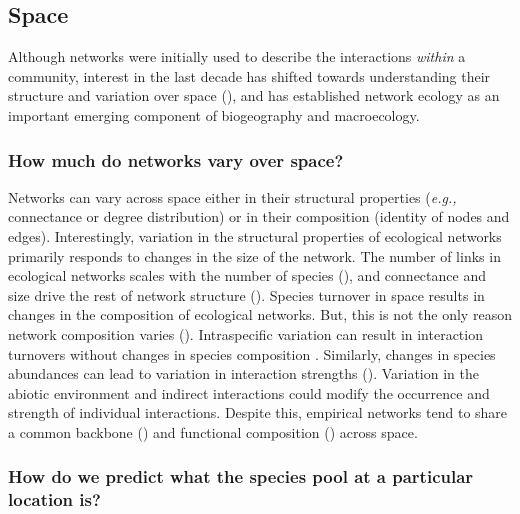 \begin{refsection}
\subsection{Space}\label{space}

Although networks were initially used to describe the interactions
\emph{within} a community, interest in the last decade has shifted
towards understanding their structure and variation over space
(\cite{Trojelsgaard2016EcoNet, Baiser2019EcoRul}), and has established
network ecology as an important emerging component of biogeography and
macroecology.

\subsubsection{How much do networks vary over
space?}\label{how-much-do-networks-vary-over-space}

Networks can vary across space either in their structural properties
(\emph{e.g.,} connectance or degree distribution) or in their composition
(identity of nodes and edges). Interestingly, variation in the
structural properties of ecological networks primarily responds to
changes in the size of the network. The number of links in ecological
networks scales with the number of species (\cite{MacDonald2020Revisiting, Brose2004Unified}), and connectance and size drive the rest of network
structure (\cite{Poisot2014WheEco, Dunne2002FooStr, Riede2010ScaFoo}).
Species turnover in space results in changes in the composition of
ecological networks. But, this is not the only reason network
composition varies (\cite{Poisot2015Species}). Intraspecific variation can
result in interaction turnovers without changes in species composition
\cite{Bolnick2011WhyInt}. Similarly, changes in species abundances can
lead to variation in interaction strengths (\cite{Canard2014EmpEva,
Vazquez2007SpeAbu}). Variation in the abiotic environment and indirect
interactions \cite{Golubski2016EcoNet} could modify the occurrence and
strength of individual interactions. Despite this, empirical networks
tend to share a common backbone (\cite{BramonMora2018Identifying}) and functional
composition (\cite{Dehling2020SimCom}) across space.

\subsubsection{How do we predict what the species pool at a particular
location
is?}\label{how-do-we-predict-what-the-species-pool-at-a-particular-location-is}


\end{refsection}
